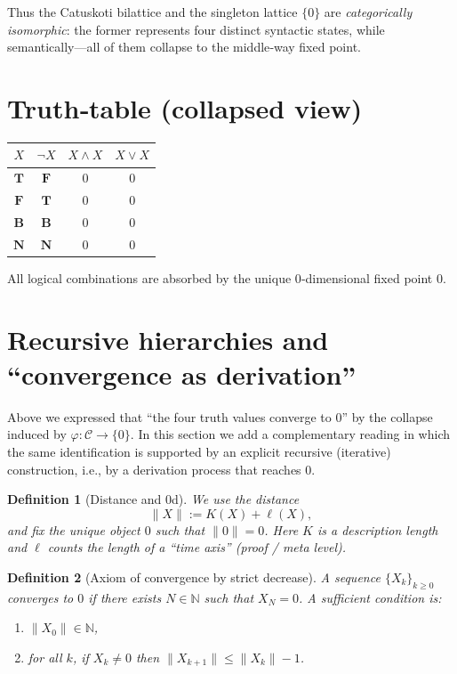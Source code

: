 \documentclass[12pt,a4paper]{article}
\newcommand{\dfix}{\mathfrak{0}}          %
\newcommand{\phiMap}{\varphi}            %
\newtheorem{definition}{Definition}[section]
\begin{document}
Thus the Catuskoti bilattice and the singleton lattice
$\{\dfix\}$ are \emph{categorically isomorphic}:
the former represents four distinct syntactic
states, while semantically—all of them collapse to the
middle‑way fixed point.

\section{Truth‑table (collapsed view)}

\begin{center}
\begin{tabular}{c|c|c|c}
$X$ & $\neg X$ & $X\wedge X$ & $X\vee X$ \\ \hline
$\mathbf{T}$ & $\mathbf{F}$ & $\dfix$ & $\dfix$ \\
$\mathbf{F}$ & $\mathbf{T}$ & $\dfix$ & $\dfix$ \\
$\mathbf{B}$ & $\mathbf{B}$ & $\dfix$ & $\dfix$ \\
$\mathbf{N}$ & $\mathbf{N}$ & $\dfix$ & $\dfix$
\end{tabular}
\end{center}
All logical combinations are absorbed by the unique
0‑dimensional fixed point $\dfix$.

\section{Recursive hierarchies and ``convergence as derivation''}

Above we expressed that ``the four truth values converge to $\dfix$'' by the collapse induced by
$\phiMap:\mathcal{C}\to\{\dfix\}$.
In this section we add a complementary reading in which the same identification is supported by
an explicit recursive (iterative) construction, i.e., by a derivation process that reaches $\dfix$.

\begin{definition}[Distance and $0$d]
We use the distance
\[
  \|X\|:=K(X)+\ell(X),
\]
and fix the unique object $\dfix$ such that $\|\dfix\|=0$.
Here $K$ is a description length and $\ell$ counts the length of a ``time axis'' (proof / meta level).
\end{definition}

\begin{definition}[Axiom of convergence by strict decrease]
A sequence $\{X_k\}_{k\ge0}$ \emph{converges} to $\dfix$ if there exists $N\in\mathbb{N}$ such that $X_N=\dfix$.
A sufficient condition is:
\begin{enumerate}
  \item $\|X_0\|\in\mathbb{N}$,
  \item for all $k$, if $X_k\neq\dfix$ then $\|X_{k+1}\|\le \|X_k\|-1$.
\end{enumerate}
\end{definition}
\end{document}
